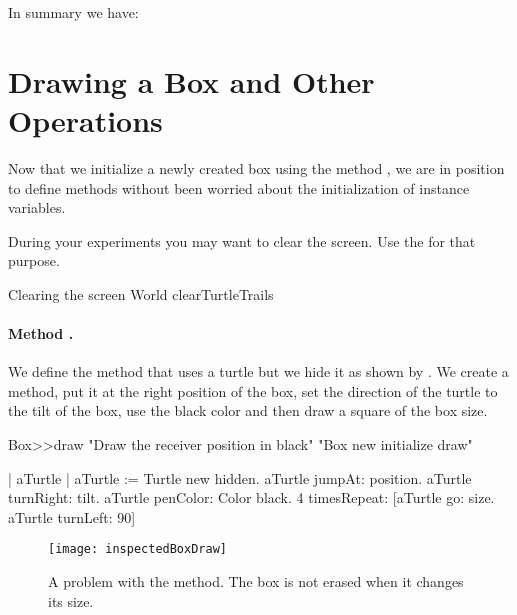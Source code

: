 In summary we have: 



\section{Drawing a Box and Other Operations}
Now that we initialize a newly created box using the method
, we are in position to define methods without been
worried about the initialization of instance variables.  

During your experiments you may want to clear the
screen.  Use the 
for that purpose.

\begin{scriptwithtitle}{Clearing the screen}\label{scr:clearingScreen}
World clearTurtleTrails
\end{scriptwithtitle}

\paragraph{Method .} We define the method  that uses a
turtle but we hide it as shown by .  We create a
method, put it at the right position of the box, set the direction of
the turtle to the tilt of the box, use the black color and then draw a
square of the box size.

\begin{method}\label{mt:draw}
Box>>draw
   "Draw the receiver position in black"
   "Box new initialize draw"
	
   | aTurtle |
   aTurtle := Turtle new hidden.
   aTurtle jumpAt: position.
   aTurtle turnRight: tilt.
   aTurtle penColor: Color black.
   4 timesRepeat: [aTurtle go: size. 
                  aTurtle turnLeft: 90]
\end{method}


\begin{figure}
\begin{center}
\texttt{[image: inspectedBoxDraw]}
\caption{A problem with the  method. The box is not erased when it changes its size.\label{fig:drawingBox}}
\end{center}
\end{figure}


